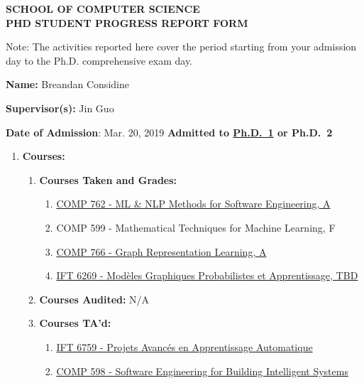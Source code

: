 \documentclass[11pt]{article}
\begin{document}
    \begin{center}
        \large {\bf SCHOOL OF COMPUTER SCIENCE \\ PHD STUDENT PROGRESS REPORT FORM}
    \end{center}

    Note: The activities reported here cover the period starting
    from your admission day to the Ph.D. comprehensive exam day.
    \medskip

    \textbf{Name:} Breandan Considine

    \textbf{Supervisor(s):} Jin Guo

    \textbf{Date of Admission}: Mar. 20, 2019
    \hspace{45mm}
    \textbf{Admitted to \underline{Ph.D.\ 1} or Ph.D.\ 2}

    \begin{enumerate}
        \item \textbf{Courses:}
        \begin{enumerate}
            \item \textbf{Courses Taken and Grades:}

            \begin{enumerate}
                \item \href{https://www.cs.mcgill.ca/~cs762/}{COMP 762 - ML \& NLP Methods for Software Engineering, A}
                \item COMP 599 - Mathematical Techniques for Machine Learning, F
                \item \href{https://cs.mcgill.ca/~wlh/comp766/}{COMP 766 - Graph Representation Learning, A}
                \item \href{http://www.iro.umontreal.ca/~slacoste/teaching/ift6269/A20/}{IFT 6269 - Mod\`eles Graphiques Probabilistes et Apprentissage, TBD}
            \end{enumerate}

            \item \textbf{Courses Audited:} N/A

            \item \textbf{Courses TA'd:}

            \begin{enumerate}
                \item \href{https://admission.umontreal.ca/cours-et-horaires/cours/IFT-6759/}{IFT 6759 - Projets Avanc\'es en Apprentissage Automatique}
                \item \href{https://github.com/jin-guo/COMP598_Fall2020}{COMP 598 - Software Engineering for Building Intelligent Systems}
            \end{enumerate}


\end{enumerate}
\end{enumerate}
\end{document}
